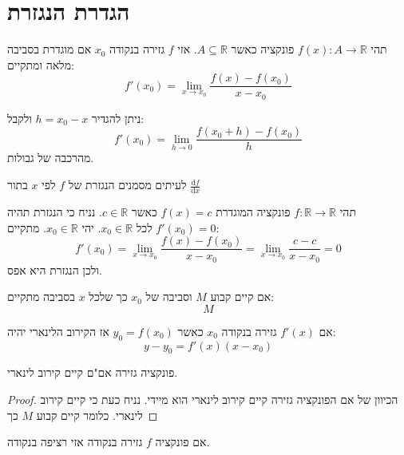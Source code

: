 \documentclass{tstextbook}
\begin{document}
\section{הגדרת הנגזרת}

\begin{definition}
תהי \(f(x):A\to \mathbb{R}\) פונקציה כאשר \(A\subseteq \mathbb{R}\). אזי \(f\) גזירה בנקודה \(x_{0}\) אם מוגדרת בסביבה מלאה ומתקיים:
$$f'(x_{0})= \lim_{ x \to x_{0} } \frac{f(x)-f(x_{0})}{x-x_{0}}$$

\end{definition}
\begin{corollary}
ניתן להגדיר \(h=x_{0}-x\) ולקבל:
$$f'(x_{0})=\lim_{ h \to 0 } \frac{f(x_{0}+h)-f(x_{0})}{h}$$
מהרכבה של גבולות.

\end{corollary}
\begin{symbolize}
לעיתים מסמנים הנגזרת של \(f\) לפי \(x\) בתור \(\frac{\mathrm{d} f}{\mathrm{d} x}\)

\end{symbolize}
\begin{example}
תהי \(f:\mathbb{R}\to \mathbb{R}\) פונקציה המוגדרת \(f(x)=c\) כאשר \(c \in \mathbb{R}\). נניח כי הנגזרת תהיה \(f'(x_{0})=0\) לכל \(x_{0} \in \mathbb{R}\). יהי \(x_{0} \in \mathbb{R}\). מתקיים:
$$f'(x_{0})= \lim_{ x \to x_{0} } \frac{f(x)-f(x_{0})}{x-x_{0}} = \lim_{ x \to x_{0} } \frac{c-c}{x-x_{0}}=0$$
ולכן הנגזרת היא אפס.

\end{example}
\begin{definition}
אם קיים קבוע \(M\) וסביבה של \(x_{0}\) כך שלכל \(x\) בסביבה מתקיים:
$$M$$

\end{definition}
\begin{proposition}
אם \(f'(x)\) גזירה בנקודה \(x_{0}\) כאשר \(y_{0}=f(x_{0})\) אז הקירוב הלינארי יהיה:
$$y-y_{0}=f'(x)(x-x_{0})$$

\end{proposition}
\begin{proposition}
פונקציה גזירה אם"ם קיים קירוב לינארי.

\end{proposition}
\begin{proof}
הכיוון של אם הפונקציה גזירה קיים קירוב לינארי הוא מיידי. נניח כעת כי קיים קירוב לינארי. כלומר קיים קבוע \(M\) כך

\end{proof}
\begin{proposition}
אם פונקציה \(f\) גזירה בנקודה אזי רציפה בנקודה.

\end{proposition}
\end{document}
